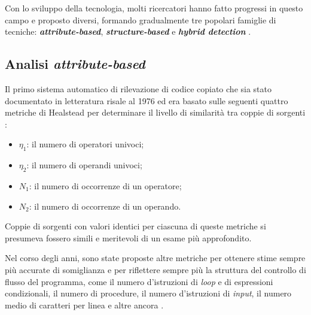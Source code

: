 



Con lo sviluppo della tecnologia, molti ricercatori hanno fatto progressi in questo campo e proposto diversi, formando gradualmente tre popolari famiglie di tecniche: \textbf{\textit{attribute-based}}, \textbf{\textit{structure-based}} e \textbf{\textit{hybrid detection}} \cite{es-plag}.

\subsection{Analisi \textit{attribute-based}}
Il primo sistema automatico di rilevazione di codice copiato che sia stato documentato in letteratura risale al 1976 \cite{ottenstein} ed era basato sulle seguenti quattro metriche di Healstead per determinare il livello di similarità tra coppie di sorgenti \cite{halstead}:

\begin{itemize}
    \item $\eta_1$: il numero di operatori univoci;
    \item $\eta_2$: il numero di operandi univoci;
    \item $N_1$: il numero di occorrenze di un operatore;
    \item $N_2$: il numero di occorrenze di un operando.
\end{itemize}

Coppie di sorgenti con valori identici per ciascuna di queste metriche si presumeva fossero simili e meritevoli di un esame più approfondito.

Nel corso degli anni, sono state proposte altre metriche per ottenere stime sempre più accurate di somiglianza e per riflettere sempre più la struttura del controllo di flusso del programma, come il numero d'istruzioni di \textit{loop} e di espressioni condizionali, il numero di procedure, il numero d'istruzioni di \textit{input}, il numero medio di caratteri per linea e altre ancora \cite{pdectet}.

